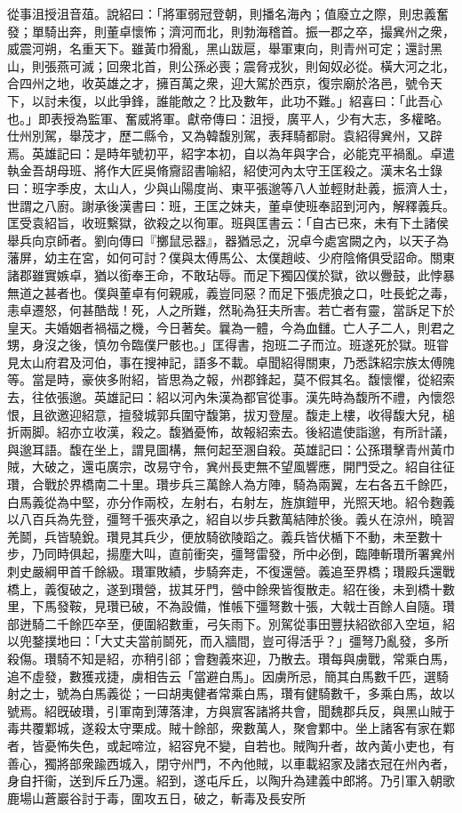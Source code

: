\begin{pinyinscope}
從事沮授沮音葅。說紹曰：「將軍弱冠登朝，則播名海內；值廢立之際，則忠義奮發；單騎出奔，則董卓懷怖；濟河而北，則勃海稽首。振一郡之卒，撮兾州之衆，威震河朔，名重天下。雖黃巾猾亂，黑山跋扈，舉軍東向，則青州可定；還討黑山，則張燕可滅；回衆北首，則公孫必喪；震脅戎狄，則匈奴必從。橫大河之北，合四州之地，收英雄之才，擁百萬之衆，迎大駕於西京，復宗廟於洛邑，號令天下，以討未復，以此爭鋒，誰能敵之？比及數年，此功不難。」紹喜曰：「此吾心也。」即表授為監軍、奮威將軍。獻帝傳曰：沮授，廣平人，少有大志，多權略。仕州別駕，舉茂才，歷二縣令，又為韓馥別駕，表拜騎都尉。袁紹得兾州，又辟焉。英雄記曰：是時年號初平，紹字本初，自以為年與字合，必能克平禍亂。卓遣執金吾胡母班、將作大匠吳脩齎詔書喻紹，紹使河內太守王匡殺之。漢末名士錄曰：班字季皮，太山人，少與山陽度尚、東平張邈等八人並輕財赴義，振濟人士，世謂之八廚。謝承後漢書曰：班，王匡之妹夫，董卓使班奉詔到河內，解釋義兵。匡受袁紹旨，收班繫獄，欲殺之以徇軍。班與匡書云：「自古已來，未有下土諸侯舉兵向京師者。劉向傳曰『擲鼠忌器』，器猶忌之，況卓今處宮闕之內，以天子為藩屏，幼主在宮，如何可討？僕與太傅馬公、太僕趙岐、少府陰脩俱受詔命。關東諸郡雖實嫉卓，猶以銜奉王命，不敢玷辱。而足下獨囚僕於獄，欲以釁鼓，此悖暴無道之甚者也。僕與董卓有何親戚，義豈同惡？而足下張虎狼之口，吐長蛇之毒，恚卓遷怒，何甚酷哉！死，人之所難，然恥為狂夫所害。若亡者有靈，當訴足下於皇天。夫婚姻者禍福之機，今日著矣。曩為一體，今為血讎。亡人子二人，則君之甥，身沒之後，慎勿令臨僕尸骸也。」匡得書，抱班二子而泣。班遂死於獄。班甞見太山府君及河伯，事在搜神記，語多不載。卓聞紹得關東，乃悉誅紹宗族太傅隗等。當是時，豪俠多附紹，皆思為之報，州郡鋒起，莫不假其名。馥懷懼，從紹索去，往依張邈。英雄記曰：紹以河內朱漢為都官從事。漢先時為馥所不禮，內懷怨恨，且欲邀迎紹意，擅發城郭兵圍守馥第，拔刃登屋。馥走上樓，收得馥大兒，槌折兩脚。紹亦立收漢，殺之。馥猶憂怖，故報紹索去。後紹遣使詣邈，有所計議，與邈耳語。馥在坐上，謂見圖構，無何起至溷自殺。英雄記曰：公孫瓚擊青州黃巾賊，大破之，還屯廣宗，改易守令，兾州長吏無不望風響應，開門受之。紹自往征瓚，合戰於界橋南二十里。瓚步兵三萬餘人為方陣，騎為兩翼，左右各五千餘匹，白馬義從為中堅，亦分作兩校，左射右，右射左，旌旗鎧甲，光照天地。紹令麴義以八百兵為先登，彊弩千張夾承之，紹自以步兵數萬結陣於後。義乆在涼州，曉習羌鬬，兵皆驍銳。瓚見其兵少，便放騎欲陵蹈之。義兵皆伏楯下不動，未至數十步，乃同時俱起，揚塵大叫，直前衝突，彊弩雷發，所中必倒，臨陣斬瓚所署兾州刺史嚴綱甲首千餘級。瓚軍敗績，步騎奔走，不復還營。義追至界橋；瓚殿兵還戰橋上，義復破之，遂到瓚營，拔其牙門，營中餘衆皆復散走。紹在後，未到橋十數里，下馬發鞍，見瓚已破，不為設備，惟帳下彊弩數十張，大戟士百餘人自隨。瓚部迸騎二千餘匹卒至，便圍紹數重，弓矢雨下。別駕從事田豐扶紹欲郤入空垣，紹以兜鍪撲地曰：「大丈夫當前鬬死，而入牆間，豈可得活乎？」彊弩乃亂發，多所殺傷。瓚騎不知是紹，亦稍引郤；會麴義來迎，乃散去。瓚每與虜戰，常乘白馬，追不虛發，數獲戎捷，虜相告云「當避白馬」。因虜所忌，簡其白馬數千匹，選騎射之士，號為白馬義從；一曰胡夷健者常乘白馬，瓚有健騎數千，多乘白馬，故以號焉。紹旣破瓚，引軍南到薄落津，方與賔客諸將共會，聞魏郡兵反，與黑山賊于毒共覆鄴城，遂殺太守栗成。賊十餘部，衆數萬人，聚會鄴中。坐上諸客有家在鄴者，皆憂怖失色，或起啼泣，紹容皃不變，自若也。賊陶升者，故內黃小吏也，有善心，獨將部衆踰西城入，閉守州門，不內他賊，以車載紹家及諸衣冠在州內者，身自扞衞，送到斥丘乃還。紹到，遂屯斥丘，以陶升為建義中郎將。乃引軍入朝歌鹿場山蒼巖谷討于毒，圍攻五日，破之，斬毒及長安所
\end{pinyinscope}

